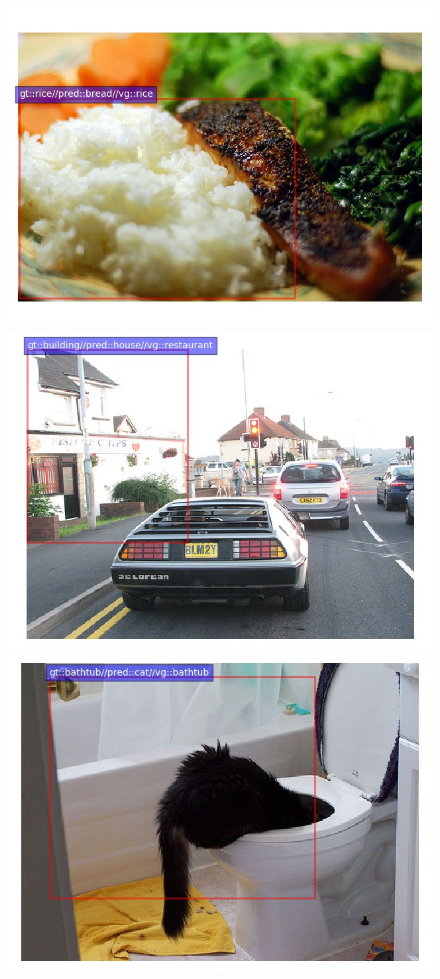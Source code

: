 \begin{figure}
	\centering
	\includegraphics[scale=.2]{images/2323938.jpg}
	\includegraphics[scale=.2]{images/2322259.jpg}
	\includegraphics[scale=.2]{images/2371657.jpg}
	

\end{figure}
